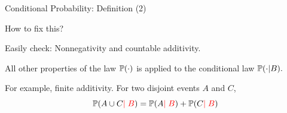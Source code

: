\documentclass[fleqn,aspectratio=169]{beamer}
\begin{document}
\begin{frame}{Conditional Probability: Definition (2)}

\plitemsep 0.1in
\bci 

\item<1-> How to fix this?  

\item<4-> Easily check: Nonnegativity and countable additivity.  

\item<5-> All other properties of the law $\mathbb{P}( \cdot )$ is applied to the conditional law $\mathbb{P}( \cdot | B ).$ 

\item<6-> For example, finite additivity. For two disjoint events $A$ and $C$, 
$$
\mathbb{P}( A \cup C {\color{red} \mid B} ) = \mathbb{P}( A {\color{red} \mid B} ) + \mathbb{P}( C {\color{red} \mid B} )
$$
\eci 

\end{frame}
\end{document}
